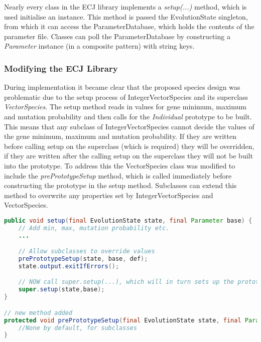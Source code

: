 \vspace{\baselineskip}

Nearly every class in the ECJ library implements a \emph{setup(...)} method, which is used initialise an instance. This method is passed the EvolutionState singleton, from which it can access the ParameterDatabase, which holds the contents of the parameter file. Classes can poll the ParameterDatabase by constructing a \emph{Parameter} instance (in a composite pattern) with string keys.

\subsubsection{Modifying the ECJ Library}
\label{subsec:ecjmod}

During implementation it became clear that the proposed species design was problematic due to the setup process of IntegerVectorSpecies and its superclass \emph{VectorSpecies}. The setup method reads in values for gene minimum, maximum and mutation probability and then calls for the \emph{Individual} prototype to be built. This means that any subclass of IntegerVectorSpecies cannot decide the values of the gene minimum, maximum and mutation probability. If they are written before calling setup on the superclass (which is required) they will be overridden, if they are written after the calling setup on the superclass they will not be built into the prototype. To address this the VectorSpecies class was modified to include the \emph{prePrototypeSetup} method, which is called immediately before constructing the prototype in the setup method. Subclasses can extend this method to overwrite any properties set by IntegerVectorSpecies and VectorSpecies.

\begin{minipage}{0.9\linewidth}
\centering
\begin{lstlisting}[language=java]
public void setup(final EvolutionState state, final Parameter base) {
    // Add min, max, mutation probability etc.
    ...

    // Allow subclasses to override values
    prePrototypeSetup(state, base, def);
    state.output.exitIfErrors();          

    // NOW call super.setup(...), which will in turn sets up the prototypical individual
    super.setup(state,base);
}

// new method added
protected void prePrototypeSetup(final EvolutionState state, final Parameter base, final Parameter def) {
    //None by default, for subclasses
}
\end{lstlisting}
\end{minipage}

